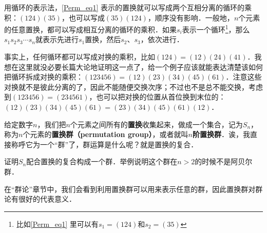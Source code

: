 用循环的表示法，\autoref{Perm_eq1}  表示的置换就可以写成两个互相分离的循环的乘积：$(1 2 4)(3 5)$，也可以写成$(3 5 )(1 2 4)$，顺序没有影响．一般地，$n$个元素的任意置换，都可以写成相互分离的循环的乘积．如果$s_i$表示一个循环\footnote{比如\autoref{Perm_eq1} 里可以有$s_1=(1 2 4)$和$s_2=(3 5)$}，那么$s_1s_2s_3\cdots s_n$就表示先进行$s_1$置换，然后$s_2$、$s_3$，依次进行．

事实上，任何循环都可以写成对换的乘积，比如$(1 2 4)=(1 2)(2 4)(4 1)$．我想在这里就没必要长篇大论地证明这一点了，给一个例子应该就能表达清楚该如何把循环拆成对换的乘积：$(1 2 3 4 5 6)=(1 2)(2 3)(3 4)(4 5)(6 1)$．注意这些对换就不是彼此分离的了，因此不能随便交换次序；不过也不是总不能交换，考虑到$(1 2 3 4 5 6)=(2 3 4 5 6 1)$，也可以把对换的位置从首位换到末位的：$(1 2)(2 3)(3 4)(4 5)(6 1)=(2 3)(3 4)(4 5)(6 1)(1 2)$．

给定数字$n$，我们把$n$个元素之间所有的\textbf{置换}收集起来，做成一个集合，记为$S_n$，称为$n$个元素的\textbf{置换群（permutation group）}，或者就叫$n$\textbf{阶置换群}．诶，我直接称呼它为一个“群”了，群运算是什么呢？就是置换的复合．

\begin{exercise}{}
证明$S_n$配合置换的复合构成一个群．举例说明这个群在$n>2$的时候不是阿贝尔群．
\end{exercise}

在“群论”章节中，我们会看到利用置换群可以用来表示任意的群，因此置换群对群论有很好的代表意义．




